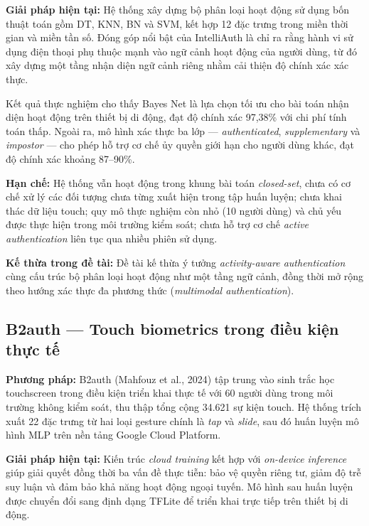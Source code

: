 \documentclass[../DoAn.tex]{subfiles}
\begin{document}
    \textbf{Giải pháp hiện tại:} Hệ thống xây dựng bộ phân loại hoạt động sử dụng bốn thuật toán gồm DT, KNN, BN và SVM, kết hợp 12 đặc trưng trong miền thời gian và miền tần số. Đóng góp nổi bật của IntelliAuth là chỉ ra rằng hành vi sử dụng điện thoại phụ thuộc mạnh vào ngữ cảnh hoạt động của người dùng, từ đó xây dựng một tầng nhận diện ngữ cảnh riêng nhằm cải thiện độ chính xác xác thực.
    
    Kết quả thực nghiệm cho thấy Bayes Net là lựa chọn tối ưu cho bài toán nhận diện hoạt động trên thiết bị di động, đạt độ chính xác 97,38\% với chi phí tính toán thấp. Ngoài ra, mô hình xác thực ba lớp --- \textit{authenticated}, \textit{supplementary} và \textit{impostor} --- cho phép hỗ trợ cơ chế ủy quyền giới hạn cho người dùng khác, đạt độ chính xác khoảng 87--90\%.
    
    \textbf{Hạn chế:} Hệ thống vẫn hoạt động trong khung bài toán \textit{closed-set}, chưa có cơ chế xử lý các đối tượng chưa từng xuất hiện trong tập huấn luyện; chưa khai thác dữ liệu touch; quy mô thực nghiệm còn nhỏ (10 người dùng) và chủ yếu được thực hiện trong môi trường kiểm soát; chưa hỗ trợ cơ chế \textit{active authentication} liên tục qua nhiều phiên sử dụng.
    
    \textbf{Kế thừa trong đề tài:} Đề tài kế thừa ý tưởng \textit{activity-aware authentication} cùng cấu trúc bộ phân loại hoạt động như một tầng ngữ cảnh, đồng thời mở rộng theo hướng xác thực đa phương thức (\textit{multimodal authentication}).
    
    \subsection{B2auth --- Touch biometrics trong điều kiện thực tế}

    \textbf{Phương pháp:} B2auth (Mahfouz et al., 2024) tập trung vào sinh trắc học touchscreen trong điều kiện triển khai thực tế với 60 người dùng trong môi trường không kiểm soát, thu thập tổng cộng 34.621 sự kiện touch. Hệ thống trích xuất 22 đặc trưng từ hai loại gesture chính là \textit{tap} và \textit{slide}, sau đó huấn luyện mô hình MLP trên nền tảng Google Cloud Platform.
    
    \textbf{Giải pháp hiện tại:} Kiến trúc \textit{cloud training} kết hợp với \textit{on-device inference} giúp giải quyết đồng thời ba vấn đề thực tiễn: bảo vệ quyền riêng tư, giảm độ trễ suy luận và đảm bảo khả năng hoạt động ngoại tuyến. Mô hình sau huấn luyện được chuyển đổi sang định dạng TFLite để triển khai trực tiếp trên thiết bị di động.
    
\end{document}
